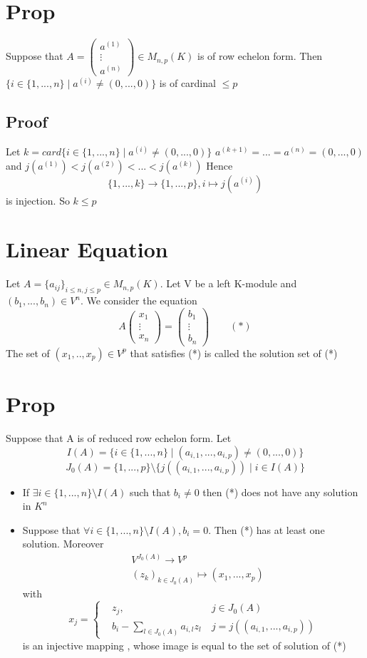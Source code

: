 \documentclass{book}
\begin{document}
\section{Prop}
Suppose that $A=\left(\begin{aligned}
    a^{(1)}\\\vdots\\a^{(n)}
\end{aligned}\right)\in M_{n,p}(K)$ is of row echelon form. Then $\{i\in \{1,...,n\}\mid a^{(i)}\not=(0,...,0)\}$ is of cardinal $\leq p$
\subsection*{Proof}
Let $k=card\{i\in \{1,...,n\}\mid a^{(i)}\not=(0,...,0)\}$ $a^{(k+1)}=...=a^{(n)}=(0,...,0)$ and $j(a^{(1)})<j(a^{(2)})<...<j(a^{(k)})$ Hence $$\{1,...,k\}\rightarrow\{1,...,p\}, i\mapsto j(a^{(i)})$$ is injection. So $k\leq p$
\section{Linear Equation}
Let $A=\{a_{ij}\}_{i\leq n,j\leq p}\in M_{n,p}(K)$. Let V be a left K-module and $(b_1,...,b_n)\in V^n$. We consider the equation $$A\left(\begin{aligned}
    x_1\\\vdots\\x_n
\end{aligned}\right)=\left(\begin{aligned}
    b_1\\\vdots\\b_n
\end{aligned}\right)\qquad(*)
$$
The set of $(x_1,..,x_p)\in V^p$ that satisfies (*) is called the solution set of (*)
\section{Prop}Suppose that A is of reduced row echelon form. Let $$I(A)=\{i\in \{1,...,n\}\mid (a_{i,1},...,a_{i,p})\not=(0,...,0)\}$$
$$J_0(A)=\{1,...,p\}\setminus\{j((a_{i,1},...,a_{i,p}))\mid i\in I(A)\}$$
\begin{itemize}
    \item If $\exists i\in \{1,...,n\}\setminus I(A)$ such that $b_i\not=0$ then (*) does not have any solution in $K^n$
    \item Suppose that $\forall i\in \{1,...,n\}\setminus I(A), b_i=0$. Then (*) has at least one solution. Moreover$$\begin{aligned}
        &V^{J_0(A)}\rightarrow V^p\\& (z_k)_{k\in J_0(A)}\mapsto (x_1,...,x_p)
    \end{aligned}$$ with $$x_j=\left\{\begin{aligned}
        &z_j,\ &j\in J_0(A)\\ & b_i-\sum\limits_{l\in J_0(A)}a_{i,l}z_l\ &j=j((a_{i,1},...,a_{i,p}))
    \end{aligned}\right.$$
    is an injective mapping , whose image is equal to the set of solution of (*)
\end{itemize}
\end{document}
